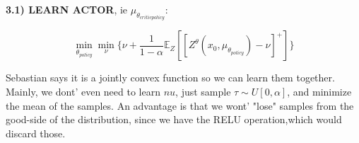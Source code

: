 \color{black}
\textbf{3.1) LEARN ACTOR}, ie $\mu_{\theta_{criticpolicy}}$:

 \begin{equation}
    \underset{\theta_{policy}} \min  \underset{\nu} \min \big\{\nu + \frac{1}{1-\alpha} \mathbb E_Z[[Z^\theta (x_0,\mu_{\theta_{policy}})- \nu]^+]\big\}
 \end{equation}

Sebastian says it is a jointly convex function so we can learn them together.
Mainly, we dont' even need to learn $nu$, just sample $\tau  \sim U[0,\alpha]$, and 
minimize the mean of the samples.
An advantage is that we wont' "lose" samples from the good-side of the distribution, since 
we have the RELU operation,which would discard those.
